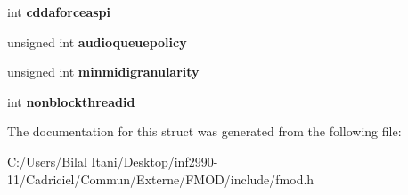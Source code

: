 \begin{DoxyCompactItemize}
\item 
int {\bfseries cddaforceaspi}\hypertarget{struct_f_m_o_d___c_r_e_a_t_e_s_o_u_n_d_e_x_i_n_f_o_a6eba4eee8813485c49042453ffdbe9bf}{}\label{struct_f_m_o_d___c_r_e_a_t_e_s_o_u_n_d_e_x_i_n_f_o_a6eba4eee8813485c49042453ffdbe9bf}

\item 
unsigned int {\bfseries audioqueuepolicy}\hypertarget{struct_f_m_o_d___c_r_e_a_t_e_s_o_u_n_d_e_x_i_n_f_o_a23344f4eafd6e30b53443c6e63045684}{}\label{struct_f_m_o_d___c_r_e_a_t_e_s_o_u_n_d_e_x_i_n_f_o_a23344f4eafd6e30b53443c6e63045684}

\item 
unsigned int {\bfseries minmidigranularity}\hypertarget{struct_f_m_o_d___c_r_e_a_t_e_s_o_u_n_d_e_x_i_n_f_o_accd465df1d73435daae0d2ef87026362}{}\label{struct_f_m_o_d___c_r_e_a_t_e_s_o_u_n_d_e_x_i_n_f_o_accd465df1d73435daae0d2ef87026362}

\item 
int {\bfseries nonblockthreadid}\hypertarget{struct_f_m_o_d___c_r_e_a_t_e_s_o_u_n_d_e_x_i_n_f_o_a99017c1720cfae07e5bd5abacf3ac2a7}{}\label{struct_f_m_o_d___c_r_e_a_t_e_s_o_u_n_d_e_x_i_n_f_o_a99017c1720cfae07e5bd5abacf3ac2a7}

\end{DoxyCompactItemize}


The documentation for this struct was generated from the following file\+:\begin{DoxyCompactItemize}
\item 
C\+:/\+Users/\+Bilal Itani/\+Desktop/inf2990-\/11/\+Cadriciel/\+Commun/\+Externe/\+F\+M\+O\+D/include/fmod.\+h\end{DoxyCompactItemize}
